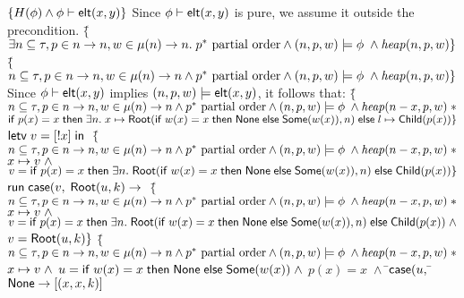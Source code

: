 \begin{specification}
\nextline $\{{H(\phi) \land {\phi} \vdash \mathsf{elt}({x}, {y})}\}$
\nextline Since ${\phi} \vdash \mathsf{elt}({x}, {y})$ is pure, we assume it outside
  the precondition. 
\nextline 
  $\{$\=$\exists n \subseteq \tau, p \in n \to n, w \in \mu(n) \to n.\;
      p^{*} \mbox{ partial order} \land 
             (n, p, w) \models \phi \;\land \mathit{heap}(n, p, w) \}$
\nextline 
  $\{$\=$n \subseteq \tau, p \in n \to n, w \in \mu(n) \to n \land
   p^{*} \mbox{ partial order} \land 
             (n, p, w) \models \phi \;\land \mathit{heap}(n, p, w) \}$
\nextline 
  Since ${\phi} \vdash \mathsf{elt}({x}, {y})$ implies $(n, p, w) \models \mathsf{elt}({x}, {y})$, it 
  follows that:
\nextline 
    $\{$\=$n \subseteq \tau, p \in n \to n, w \in \mu(n) \to n \land
      p^{*} \mbox{ partial order} \land 
             (n, p, w) \models \phi \;\land \mathit{heap}(n - {x}, p, w) \;*$ 
\nextline 
    \> $\mathsf{if}\;{p(x) = x}\;\mathsf{then}\;{\exists n.\; x \mapsto \mathsf{Root}(\mathsf{if}\;{w(x) = x}\;\mathsf{then}\;{\mathsf{None}}\;\mathsf{else}\;{\mathsf{Some}(w(x))}, n)}\;\mathsf{else}\;{l \mapsto \mathsf{Child}(p(x))}
\}$
\nextline $\mathsf{letv}\;v = [!x]\;\mathsf{in}\;$
\nextline
    $\{$\=$n \subseteq \tau, p \in n \to n, w \in \mu(n) \to n \land
      p^{*} \mbox{ partial order} \land 
             (n, p, w) \models \phi \;\land \mathit{heap}(n - {x}, p, w)\;*$ 
\nextline
    \> $x \mapsto v\;\land$ 
\nextline
    \> $v = \mathsf{if}\;{p(x) = x}\;\mathsf{then}\;{\exists n.\; \mathsf{Root}(\mathsf{if}\;{w(x) = x}\;\mathsf{then}\;{\mathsf{None}}\;\mathsf{else}\;{\mathsf{Some}(w(x))}, n)}\;\mathsf{else}\;{\mathsf{Child}(p(x))} \}$
\nextline $\mathsf{run}\;{}\mathsf{case}(v,$
\nextline \;\;$\mathsf{Root}(u,k) \to\;$
\nextline \;\;
    $\{$\=$n \subseteq \tau, p \in n \to n, w \in \mu(n) \to n \land
      p^{*} \mbox{ partial order} \land 
             (n, p, w) \models \phi \;\land \mathit{heap}(n - {x}, p, w)\;*$ 
\nextline
    \> $x \mapsto v \;\land$
\nextline
    \> $v = \mathsf{if}\;{p(x) = x}\;\mathsf{then}\;{\exists n.\; \mathsf{Root}(\mathsf{if}\;{w(x) = x}\;\mathsf{then}\;{\mathsf{None}}\;\mathsf{else}\;{\mathsf{Some}(w(x))}, n)}\;\mathsf{else}\;{\mathsf{Child}(p(x))} \;\land$ 
\nextline \> $v = \mathsf{Root}(u, k)\}$
\nextline \;\;
    $\{$\=$n \subseteq \tau, p \in n \to n, w \in \mu(n) \to n \land
      p^{*} \mbox{ partial order} \land 
             (n, p, w) \models \phi \;\land \mathit{heap}(n - {x}, p, w)\;*$ 
\nextline
    \> $x \mapsto v \;\land$
\nextline
    \> $u = \mathsf{if}\;{w(x) = x}\;\mathsf{then}\;{\mathsf{None}}\;\mathsf{else}\;{\mathsf{Some}(w(x))} \;\land$ 
\nextline
    \> $p(x) = x \;\land$
\nextline \;\;\=$\mathsf{case}(u,$ 
\nextline \>\;\;\=$\mathsf{None} \to [(x, x, k)]$ 

  

\end{specification}
